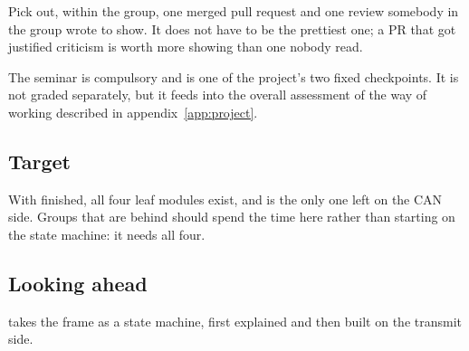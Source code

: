 Pick out, within the group, one merged pull request and one review somebody in the group wrote to
show. It does not have to be the prettiest one; a PR that got justified criticism is worth more
showing than one nobody read.

The seminar is compulsory and is one of the project's two fixed checkpoints. It is not graded
separately, but it feeds into the overall assessment of the way of working described in
appendix~\ref{app:project}.

\subsection*{Target}
With  finished, all four leaf modules exist, and  is the only
one left on the CAN side. Groups that are behind should spend the time here rather than starting on
the state machine: it needs all four.

\subsection*{Looking ahead}
 takes the frame as a state machine, first explained and then built on the transmit
side.
